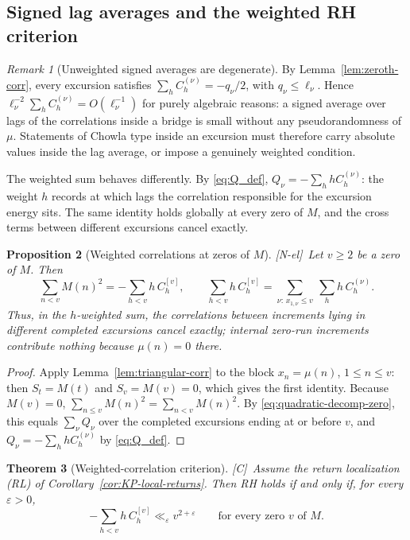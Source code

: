 \documentclass[11pt]{amsart}
\numberwithin{equation}{section}
\theoremstyle{plain}
\newtheorem{theorem}{Theorem}[section]
\newtheorem{proposition}[theorem]{Proposition}
\theoremstyle{definition}
\theoremstyle{remark}
\newtheorem{remark}[theorem]{Remark}
\newcommand{\eps}{\varepsilon}
\newcommand{\tagNE}{\textup{[N-el]}}
\newcommand{\tagC}{\textup{[C]}}
\begin{document}
\subsection{Signed lag averages and the weighted RH criterion}

\begin{remark}[Unweighted signed averages are degenerate]
\label{rem:chowla-degenerate}
By Lemma~\ref{lem:zeroth-corr}, every excursion satisfies
$\sum_hC_h^{(\nu)}=-q_\nu/2$, with $q_\nu\le\ell_\nu$. Hence
$\ell_\nu^{-2}\sum_hC^{(\nu)}_h=O(\ell_\nu^{-1})$ for purely algebraic
reasons: a signed average over lags of the correlations inside a bridge is
small without any pseudorandomness of $\mu$. Statements of Chowla type
inside an excursion must therefore carry absolute values inside the lag
average, or impose a genuinely weighted condition.
\end{remark}

The weighted sum behaves differently. By \eqref{eq:Q_def},
$Q_\nu=-\sum_hhC_h^{(\nu)}$: the weight $h$ records at which lags the
correlation responsible for the excursion energy sits. The same identity
holds globally at every zero of $M$, and the cross terms between different
excursions cancel exactly.

\begin{proposition}[Weighted correlations at zeros of $M$]
\label{prop:weighted-global}
\tagNE\ Let $v\ge2$ be a zero of $M$. Then
\begin{equation}
\label{eq:weighted-global}
\sum_{n<v}M(n)^2=-\sum_{h<v}h\,C^{[v]}_h,
\qquad
\sum_{h<v}h\,C^{[v]}_h=\sum_{\nu:\,x_{1,\nu}\le v}\ \sum_hh\,C^{(\nu)}_h .
\end{equation}
Thus, in the $h$-weighted sum, the correlations between increments lying in
different completed excursions cancel exactly; internal zero-run increments contribute nothing because $\mu(n)=0$ there.
\end{proposition}

\begin{proof}
Apply Lemma~\ref{lem:triangular-corr} to the block $x_n=\mu(n)$,
$1\le n\le v$: then $S_t=M(t)$ and $S_v=M(v)=0$, which gives the first
identity. Because $M(v)=0$, $\sum_{n\le v}M(n)^2=\sum_{n<v}M(n)^2$.  By
\eqref{eq:quadratic-decomp-zero}, this equals $\sum_\nu Q_\nu$ over the completed excursions ending at or before $v$, and
$Q_\nu=-\sum_hhC^{(\nu)}_h$ by \eqref{eq:Q_def}.
\end{proof}

\begin{theorem}[Weighted-correlation criterion]
\label{thm:weighted-corr-RH}
\tagC\ Assume the return localization (RL) of
Corollary~\ref{cor:KP-local-returns}. Then RH holds if and only if, for every $\eps>0$,
\[
-\sum_{h<v}h\,C^{[v]}_h\ll_\eps v^{2+\eps}
\qquad\text{for every zero $v$ of $M$.}
\]
\end{theorem}
\end{document}
